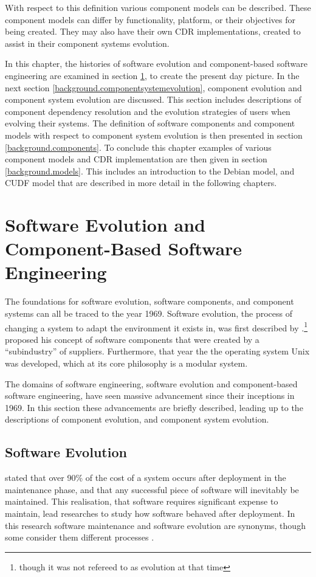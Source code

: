 With respect to this definition various component models can be described.
These component models can differ by functionality, platform, or their objectives for being created.
They may also have their own CDR implementations, created to assist in their component systems evolution. 

In this chapter, the histories of software evolution and component-based software engineering are examined in section \ref{background.histories}, to create the present day picture.
In the next section \ref{background.componentsystemevolution}, component evolution and component system evolution are discussed.
This section includes descriptions of component dependency resolution and the evolution strategies of users when evolving their systems.
The definition of software components and component models with respect to component system evolution is then presented in section \ref{background.components}.
To conclude this chapter  examples of various component models and CDR implementation are then given in section \ref{background.models}.
This includes an introduction to the Debian model, and CUDF model that are described in more detail in the following chapters.

\section{Software Evolution and Component-Based Software Engineering}
\label{background.histories}
The foundations for software evolution, software components, and component systems can all be traced to the year 1969.
Software evolution, the process of changing a system to adapt the environment it exists in, 
was first described by \cite{Lehman1969}.\footnote{though it was not refereed to as evolution at that time}
\cite{McIlroy1969} proposed his concept of software components that were created by a ``subindustry'' of suppliers.
Furthermore, that year the the operating system Unix \citep{raymond2003art} was developed, which at its core philosophy is a modular system.

The domains of software engineering, software evolution and component-based software engineering, have seen massive advancement since their inceptions in 1969.
In this section these advancements are briefly described, leading up to the descriptions of component evolution, and component system evolution.

\subsection{Software Evolution}
\cite{Brooks1975} stated that over 90\% of the cost of a system occurs after deployment in the maintenance phase,
and that any successful piece of software will inevitably be maintained.
This realisation, that software requires significant expense to maintain, lead researches to study how software behaved after deployment.
In this research software maintenance and software evolution are synonyms, though some consider them different processes \citep{Lehman2006,Godfrey2008}.

